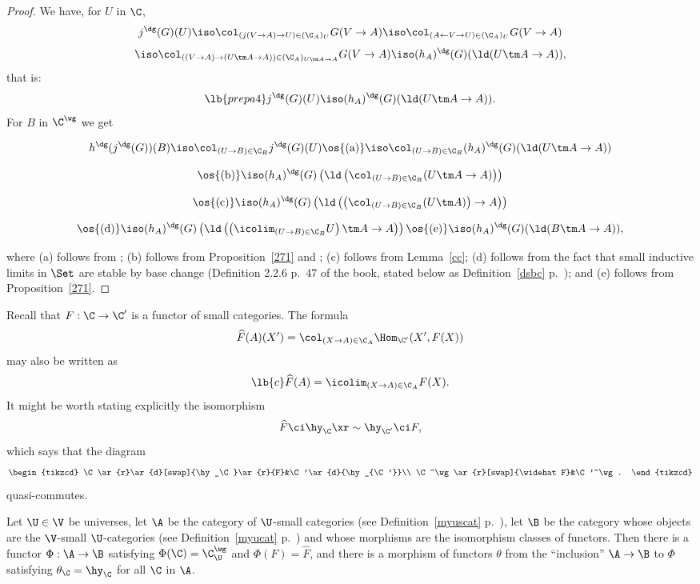 \documentclass[12pt]{article}
\theoremstyle{remark}
\theoremstyle{definition}
\begin{document}
\begin{proof}
We have, for $U$ in $\C$, 
$$
j^\dg(G)(U)\iso\col_{(j(V\to A)\to U)\in(\C_A)_U}G(V\to A)\iso\col_{(A\leftarrow V\to U)\in(\C_A)_U}G(V\to A)
$$
$$
\iso\col_{((V\to A)\to(U\tm A\to A))\in(\C_A)_{U\tm A\to A}}G(V\to A)\iso(h_A)^\dg(G)(\ld(U\tm A\to A)),
$$
that is: 
%
\begin{equation}\lb{prepa4}
j^\dg(G)(U)\iso(h_A)^\dg(G)(\ld(U\tm A\to A)).
\end{equation} 
%
For $B$ in $\C^\wg$ we get 

$$h^\dg(j^\dg(G))(B)\iso\col_{(U\to B)\in\C_B}j^\dg(G)(U)\os{(\text a)}\iso\col_{(U\to B)\in\C_B}(h_A)^\dg(G)(\ld(U\tm A\to A))$$

$$\os{(\text b)}\iso(h_A)^\dg(G)\left(\ld\left(\col_{(U\to B)\in\C_B}(U\tm A\to A)\right)\right)$$

$$\os{(\text c)}\iso(h_A)^\dg(G)\left(\ld\left(\left(\col_{(U\to B)\in\C_B}(U\tm A)\right)\to A\right)\right)$$

$$\os{(\text d)}\iso(h_A)^\dg(G)\left(\ld\left(\left(\icolim_{(U\to B)\in\C_B}U\right)\tm A\to A\right)\right)\os{(\text e)}\iso(h_A)^\dg(G)(\ld(B\tm A\to A)),$$ 

\nn where 
(a) follows from ; 
(b) follows from Proposition~\ref{271} and ;  
(c) follows from Lemma~\ref{cc}; 
(d) follows from the fact that small inductive limits in $\Set$ are stable by base change (Definition 2.2.6 p.~47 of the book, stated below as Definition~\ref{dsbc} p.~); and 
(e) follows from Proposition~\ref{271}.
\end{proof}



Recall that $F:\C\to\C'$ is a functor of small categories. The formula 
$$
\widehat F(A)(X')=\col_{(X\to A)\in\C_A}\Hom_{\C'}(X',F(X))
$$ 
may also be written as 
\begin{equation}\lb{c}
\widehat F(A)=\icolim_{(X\to A)\in\C_A}F(X).
\end{equation}
It might be worth stating explicitly the isomorphism 
$$
\widehat F\ci\hy_\C\xr\sim\hy_{\C'}\ci F, 
$$ 
which says that the diagram 
$$
\begin{tikzcd}
\C\ar{r}\ar{d}[swap]{\hy_\C}\ar{r}{F}&\C'\ar{d}{\hy_{\C'}}\\ 
\C^\wg\ar{r}[swap]{\widehat F}&\C'^\wg.
\end{tikzcd}
$$ 
quasi-commutes. 

\begin{prop} 
Let $\U\in\V$ be universes, let $\A$ be the category of $\U$-small categories (see Definition~\ref{myuscat} p.~), let $\B$ be the category whose objects are the $\V$-small $\U$-categories (see Definition~\ref{myucat} p.~) and whose morphisms are the isomorphism classes of functors. Then there is a functor $\Phi:\A\to\B$ satisfying $\Phi(\C)=\C^\wg_\U$ and $\Phi(F)=\widehat F$, and there is a morphism of functors $\theta$ from the ``inclusion'' $\A\to\B$ to $\Phi$ satisfying $\theta_\C=\hy_\C$ for all $\C$ in $\A$. 
\end{prop}
\end{document}
